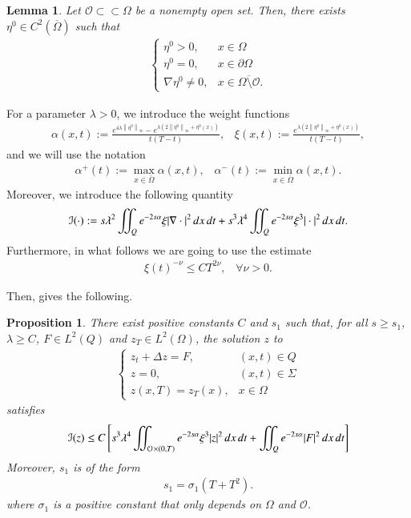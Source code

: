 \documentclass[preprint,1p]{elsarticle}
\newcommand{\norm}[2]{\left\|#1\right\|_{#2}}
\newcommand{\intd}{\displaystyle\int \kern -7pt \int}
\newtheorem{proposition}{\bf Proposition}[section]
\newtheorem{lemma}{\bf Lemma}[section]
\begin{document}
\begin{lemma}
Let $\mathcal O\subset\subset \Omega$ be a nonempty open set. Then, there exists $\eta^0\in C^2(\overline{\Omega})$ such that
\begin{align*}
	\begin{cases}
		\eta^0>0, & x\in\Omega
		\\
		\eta^0 = 0, & x\in\partial\Omega
		\\
		\nabla\eta^0\neq 0, & x\in\overline{\Omega\setminus{ \mathcal O}}.
	\end{cases}
\end{align*}
\end{lemma}
%
For a parameter $\lambda>0$, we introduce the weight functions
%
\begin{align}\label{weight}
	\alpha(x,t):=\frac{e^{4\lambda\norm{\eta^0}{\infty}}-e^{\lambda\left(2\norm{\eta^0}{\infty}+\eta^0(x)\right)}}{t(T-t)}, \;\;\; \xi(x,t):=\frac{e^{\lambda\left(2\norm{\eta^0}{\infty}+\eta^0(x)\right)}}{t(T-t)},
\end{align}
and we will use the notation 
\begin{align}\label{notation_alpha}
	\alpha^+(t):= \max_{x\in\overline{\Omega}}\alpha(x,t), \;\;\; \alpha^-(t):= \min_{x\in\overline{\Omega}}\alpha(x,t). 
\end{align}
Moreover, we introduce the following quantity 
\begin{align*}
	\mathcal I(\cdot):= s\lambda^2\intd_Q e^{-2s\alpha}\xi|\nabla \cdot|^2\,dx\,dt + s^3\lambda^4\intd_Q e^{-2s\alpha}\xi^3|\cdot|^2\,dx\,dt.
\end{align*}	
Furthermore, in what follows we are going to use the estimate
\begin{align}\label{xi_est}
	\xi(t)^{-\nu}\leq CT^{2\nu},\;\;\;\forall\nu>0.
\end{align}

Then, \cite[Lemma 1.3]{fernandez2006global} gives the following.

\begin{proposition}\label{carleman z_prop} 
There exist positive constants $C$ and $s_1$ such that, for all $s\geq s_1$, $\lambda\geq C$, $F\in L^2(Q)$ and $z_T\in L^2(\Omega)$, the solution $z$ to 
\begin{align}\label{syst_z}
	\begin{cases}
		z_t+\Delta z = F, & (x,t)\in Q
		\\
		z=0, & (x,t)\in\Sigma
		\\
		z(x,T) = z_T(x), & x\in \Omega
	\end{cases}
\end{align}
satisfies
\begin{align}\label{carleman z}
	\mathcal{I}(z) \leq C \left[s^3\lambda^4\intd_{\mathcal O\times(0,T)} e^{-2s\alpha}\xi^3 |z|^2\,dx\,dt + \intd_Q e^{-2s\alpha}|F|^2\,dx\,dt\right]
\end{align}
Moreover, $s_1$ is of the form 
\begin{align}\label{e6s2}
	s_1 = \sigma_1\left(T+T^2\right).
\end{align}
where $\sigma_1$ is a positive constant that only depends on $\Omega$ and $\mathcal O$.
\end{proposition}
\end{document}
